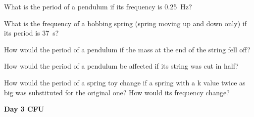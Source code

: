 \documentclass[]{exam}
\begin{document}
\begin{questions}

\question
What is the period of a pendulum if its frequency is \SI{0.25}{Hz}?

\question
What is the frequency of a bobbing spring (spring moving up and down only) if its period is \SI{37}{s}?

\question
How would the period of a pendulum if the mass at the end of the string fell off?

\question
How would the period of a pendulum be affected if its string was cut in half?

\question
How would the period of a spring toy change if a spring with a k value twice as big was substituted for the original one? How would its frequency change?
\end{questions}


\textbf{Day 3 CFU}
\end{document}
